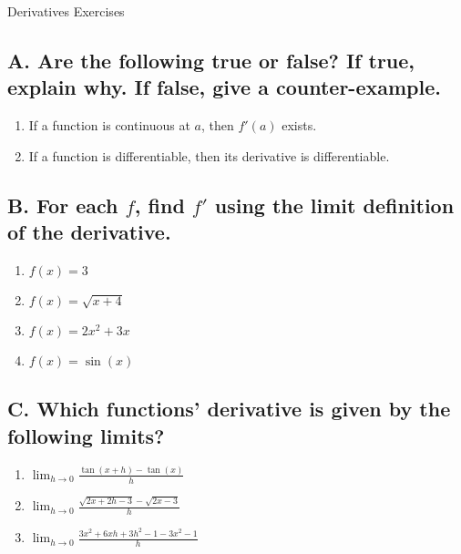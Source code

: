 \documentclass{article}
\begin{document}
\begin{center}
\begin{Huge}Derivatives Exercises\end{Huge}
\end{center}


\subsection*{A. Are the following true or false? If true, explain why. If false, give a counter-example.}
\begin{enumerate}
\item If a function is continuous at $a$, then $f'(a)$ exists.
\item If a function is differentiable, then its derivative is differentiable.
\end{enumerate}

\subsection*{B. For each $f$, find $f'$ using the limit definition of the derivative.}
\begin{multicols}{4}
\begin{enumerate}
\item $f(x)=3$
\item $f(x)=\sqrt{x+4}$
\item $f(x)=2x^2 + 3x$
\item $f(x)=\sin(x)$
\end{enumerate}
\end{multicols}

\subsection*{C. Which functions' derivative is given by the following limits?}
\begin{multicols}{3}
\begin{enumerate}
\item $\displaystyle\lim_{h\to 0}\frac{\tan(x+h)-\tan(x)}{h}$
\item $\displaystyle\lim_{h\to 0}\frac{\sqrt{2x+2h-3}-\sqrt{2x-3}}{h}$
\item $\displaystyle\lim_{h\to 0}\frac{3x^2+6xh+3h^2-1-3x^2-1}{h}$
\end{enumerate}
\end{multicols}
\end{document}
